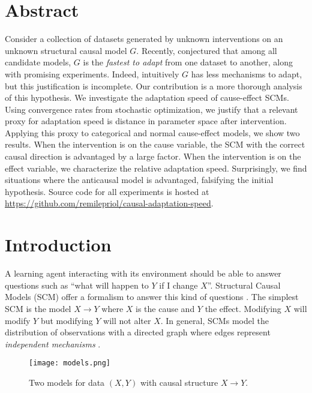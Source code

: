 \section{Abstract}
Consider a collection of datasets generated by unknown interventions on an unknown structural causal model $G$.
Recently, \citet{bengio2019meta} conjectured that among all candidate models, $G$ is the \emph{fastest to adapt} from one dataset to another, along with promising experiments. 
Indeed, intuitively $G$ has less mechanisms to adapt, but this justification is incomplete.
Our contribution is a more thorough analysis of this hypothesis.
We investigate the adaptation speed of cause-effect SCMs.
Using convergence rates from stochastic optimization, we justify that a relevant proxy for adaptation speed is distance in parameter space after intervention.
Applying this proxy to categorical and normal cause-effect models, we show two results.
When the intervention is on the cause variable, the SCM with the correct causal direction is advantaged by a large factor.
When the intervention is on the effect variable, we characterize the relative adaptation speed. 
Surprisingly, we find situations where the anticausal model is advantaged, falsifying the initial hypothesis.
Source code for all experiments is hosted at 
\url{https://github.com/remilepriol/causal-adaptation-speed}.


\section{Introduction}

A learning agent interacting with its environment should be able to answer questions such as ``what will happen to $Y$ if I change $X$''.
Structural Causal Models (SCM) offer a formalism to answer this kind of questions \citep{pearl2009causality,peters2017elements}. 
The simplest SCM is the model $X\rightarrow Y$ where $X$ is the cause and $Y$ the effect.
Modifying $X$ will modify $Y$ but modifying $Y$ will not alter $X$.
In general, SCMs model the distribution of observations with a directed graph where edges represent \textit{independent mechanisms} \citep{janzing2010causal}.

\begin{wrapfigure}[6]{l}{.5\textwidth} 
    \centering
    \texttt{[image: models.png]}
    \caption{Two models for data $(X, Y)$ with causal structure $X\rightarrow Y$.}
    \label{fig:cause-effect}
\end{wrapfigure}

